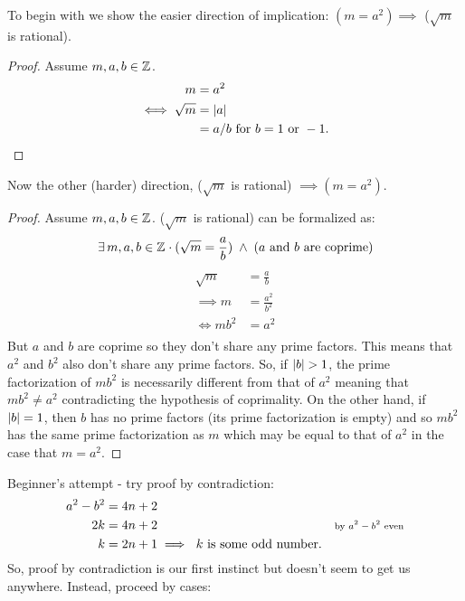 \documentclass[../MathsNotesBase.tex]{subfiles}
\begin{document}
{		
		To begin with we show the easier direction of implication: $(m = a^2) \implies$ ($\sqrt{m}$ is rational).
		\begin{proof}
		Assume $m,a,b \in \mathbb{Z}^{}$.
		\begin{align*}
		m &= a^2 \\
		\iff \sqrt{m} &= \left\lvert a\right\rvert \\
		&= a/b \text{ for } b = 1 \text{ or } -1. \qedhere
		\end{align*}
		\end{proof}
		Now the other (harder) direction, ($\sqrt{m}$ is rational) $\implies (m = a^2)$.
		\begin{proof}
		Assume $m,a,b \in \mathbb{Z}^{}$. ($\sqrt{m}$ is rational) can be formalized as:
		\[ \exists\,m,a,b \in \mathbb{Z}^{} \cdot (\sqrt{m} = \frac{a}{b}) \; \wedge \; \text{($a$ and $b$ are coprime)} \]
		\begin{align*}
		\sqrt{m} &= \frac{a}{b} \\[8pt]
		\implies m &= \frac{a^2}{b^2} \\[8pt]
		\iff mb^2 &= a^2 \\ 
		\end{align*}
		But $a$ and $b$ are coprime so they don't share any prime factors. This means that $a^2$ and $b^2$ also don't share any prime factors. So, if $\left\lvert b\right\rvert > 1$, the prime factorization of $mb^2$ is necessarily different from that of $a^2$ meaning that $mb^2 \neq a^2$ contradicting the hypothesis of coprimality.
		On the other hand, if $\left\lvert b\right\rvert = 1$, then $b$ has no prime factors (its prime factorization is empty) and so $mb^2$ has the same prime factorization as $m$ which may be equal to that of $a^2$ in the case that $m = a^2$.
		\end{proof}
		\bigskip
		
		\bigskip
		Beginner's attempt - try proof by contradiction:
		\begin{align*}
		a^2 - b^2 &= 4n + 2 \\
		2k &= 4n + 2 &\text{\scriptsize{by $a^2 - b^2$ even}}\\
		k &= 2n + 1 \implies \text{ $k$ is some odd number.}
		\end{align*}
		So, proof by contradiction is our first instinct but doesn't seem to get us anywhere.
		Instead, proceed by cases:
}
\end{document}
